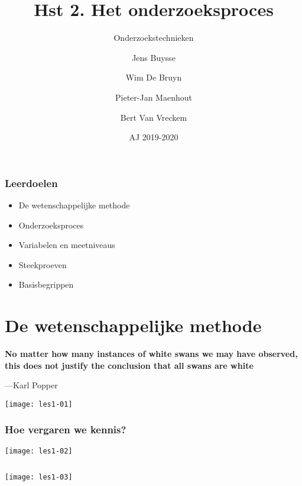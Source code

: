 \documentclass[aspectratio=169]{beamer}
\title[OZT: aan de slag]{Hst 2. Het onderzoeksproces}
\subtitle{Onderzoekstechnieken}
\author{Jens Buysse \and Wim {De Bruyn} \and Pieter-Jan Maenhout \and Bert {Van Vreckem}}
\date{AJ 2019-2020}
\begin{document}
\begin{frame}
  \maketitle
\end{frame}

\begin{frame}
  \frametitle{Leerdoelen}
  
  \begin{itemize}
    \item De wetenschappelijke methode
    \item Onderzoeksproces
    \item Variabelen en meetniveaus
    \item Steekproeven
    \item Basisbegrippen
  \end{itemize}
\end{frame}

\section{De wetenschappelijke methode}


\begin{frame}[plain]
  \bfseries\Large
  No matter how many instances of white swans we may have observed, this does not justify the conclusion that all swans are white
  
  \bigskip
  
  ---Karl Popper
\end{frame}

\begin{frame}[plain]
  \centering
  \texttt{[image: les1-01]}
\end{frame}

\begin{frame}
  \frametitle{Hoe vergaren we kennis?}
  
  \centering
  \texttt{[image: les1-02]}
\end{frame}

\begin{frame}[plain,c]
  \begin{columns}
    \column{\dimexpr\paperwidth}
    \texttt{[image: les1-03]}
  \end{columns}
\end{frame}
\end{document}
